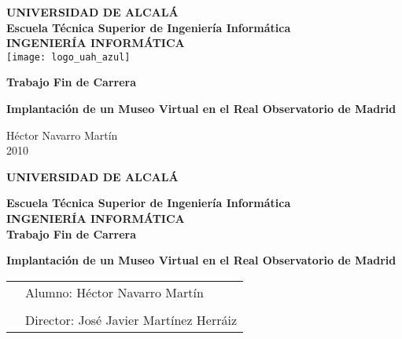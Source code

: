 \thispagestyle{empty}
\large
\vspace{3cm}
\begin{center}

{
\Large\textbf{UNIVERSIDAD DE ALCALÁ}}  \\
\vspace{1cm}
\textbf{Escuela Técnica Superior de Ingeniería Informática}\\

\vspace{1cm}
{\Large\textbf{INGENIERÍA INFORMÁTICA}}\\
\vspace{15mm}
\texttt{[image: logo\_uah\_azul]}
\vspace{1cm}

\textbf{Trabajo Fin de Carrera}\\
\vspace{2cm}

{\LARGE \textbf{Implantación de un Museo Virtual en el Real Observatorio de Madrid}}

\end{center}
\vspace{4cm}
\begin{flushright}
  Héctor Navarro Martín\\
  2010
\end{flushright}

\newpage
\clearemptydoublepage
\thispagestyle{empty}
\large
\begin{center}
{\Large\textbf{UNIVERSIDAD DE ALCALÁ}}  \\
\vspace{7mm}

\textbf{Escuela Técnica Superior de Ingeniería Informática}\\

\vspace{7mm}
{\Large\textbf{INGENIERÍA INFORMÁTICA}}\\
\vspace{2cm}
\textbf{Trabajo Fin de Carrera}\\
\vspace{2cm}

{\Large \textbf{Implantación de un Museo Virtual en el Real Observatorio de Madrid}}

\end{center}
\vspace{2cm}
\noindent
\begin{tabular}{p{5cm}l}
&Alumno: Héctor Navarro Martín\\
&\\
&Director: José Javier Martínez Herráiz
\end{tabular}


